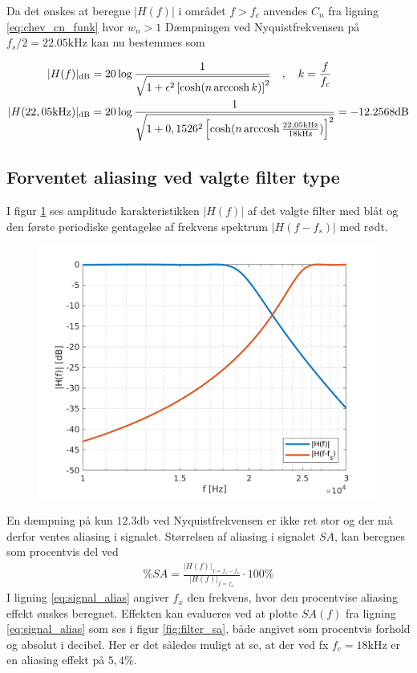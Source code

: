 Da det ønskes at beregne $|H(f)|$ i området $f > f_c$ anvendes $C_n$ fra ligning \ref{eq:chev_cn_funk} hvor $w_n > 1$
Dæmpningen ved Nyquistfrekvensen på $f_s/2 = \num{22.05}\si{\kilo\hertz}$ kan nu bestemmes som

\begin{align}
|H(f)|_{\si{\decibel}} &= 20 \log \frac{1}{\sqrt{1+ \epsilon^2  \left[\cosh(n \arccosh k )\right]^2 }} \quad, \quad k = \frac{f}{f_c} \\
|H(22,05\si{\kilo\hertz})|_{\si{\decibel}} &= 20 \log \frac{1}{\sqrt{1+ 0,1526^2  \left[\cosh(n \arccosh \frac{22,05\si{\kilo\hertz}}{18\si{\kilo\hertz}} )\right]^2 }} = \num{-12.2568} \si{\decibel}
\end{align}

\subsection{Forventet aliasing ved valgte filter type}
I figur \ref{fig:filter_f_fs} ses amplitude karakteristikken $|H(f)|$ af det valgte filter med blåt og den første periodiske gentagelse af frekvens spektrum $|H(f-f_s)|$ med rødt.
\begin{figure}[h!]
	\centering
	\includegraphics[width=.8\textwidth]{matlab/filter_f_fs.png}
	\caption{}
	\label{fig:filter_f_fs}
\end{figure}

En dæmpning på kun $\num{12.3} \si{\decibel}$ ved Nyquistfrekvensen er ikke ret stor og der må derfor ventes aliasing i signalet.
Størrelsen af aliasing i signalet $SA$, kan beregnes som procentvis del ved
\begin{align}
	\%SA = \frac{|H(f)|_{f=f_s-f_x}}{|H(f)|_{f=f_x}} \cdot 100 \% \label{eq:signal_alias}
\end{align} 
I ligning \ref{eq:signal_alias} angiver $f_x$ den frekvens, hvor den procentvise aliasing effekt ønskes beregnet.
Effekten kan evalueres ved at plotte $SA(f)$ fra ligning \ref{eq:signal_alias} som ses i figur \ref{fig:filter_sa}, både angivet som procentvis forhold og absolut i decibel.
Her er det således muligt at se, at der ved fx $f_c=\num{18}\si{\kilo\hertz}$ er en aliasing effekt på $5,4\%$.

